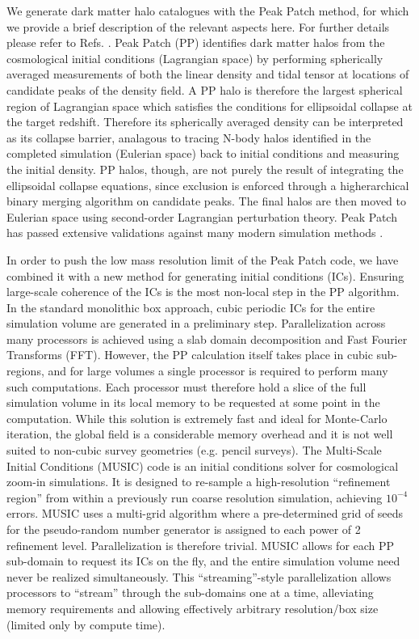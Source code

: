 We generate dark matter halo catalogues with the Peak Patch method, for which we provide a brief description of the relevant aspects here. For further details please refer to Refs. \citep{peakpatch1,peakpatch2,peakpatch3}. Peak Patch (PP) identifies dark matter halos from the cosmological initial conditions (Lagrangian space) by performing spherically averaged measurements of both the linear density and tidal tensor at locations of candidate peaks of the density field. A PP halo is therefore the largest spherical region of Lagrangian space which satisfies the conditions for ellipsoidal collapse at the target redshift. Therefore its spherically averaged density can be interpreted as its collapse barrier, analagous to tracing N-body halos identified in the completed simulation (Eulerian space) back to initial conditions and measuring the initial density. PP halos, though, are not purely the result of integrating the ellipsoidal collapse equations, since exclusion is enforced through a higherarchical binary merging algorithm on candidate peaks. The final halos are then moved to Eulerian space using second-order Lagrangian perturbation theory. Peak Patch has passed extensive validations against many modern simulation methods \cite{euclidcp1, euclidcp2, euclidcp3}.

In order to push the low mass resolution limit of the Peak Patch code, we have combined it with a new method for generating initial conditions (ICs). Ensuring large-scale coherence of the ICs is the most non-local step in the PP algorithm. In the standard monolithic box approach, cubic periodic ICs for the entire simulation volume are generated in a preliminary step. Parallelization across many processors is achieved using a slab domain decomposition and Fast Fourier Transforms (FFT). However, the PP calculation itself takes place in cubic sub-regions, and for large volumes a single processor is required to perform many such computations. Each processor must therefore hold a slice of the full simulation volume in its local memory to be requested at some point in the computation. While this solution is extremely fast and ideal for Monte-Carlo iteration, the global field is a considerable memory overhead and it is not well suited to non-cubic survey geometries (e.g. pencil surveys). The Multi-Scale Initial Conditions (MUSIC) \citep{music} code is an initial conditions solver for cosmological zoom-in simulations. It is designed to re-sample a high-resolution ``refinement region'' from within a previously run coarse resolution simulation, achieving $10^{-4}$ errors. MUSIC uses a multi-grid algorithm where a pre-determined grid of seeds for the pseudo-random number generator is assigned to each power of 2 refinement level. Parallelization is therefore trivial. MUSIC allows for each PP sub-domain to request its ICs on the fly, and the entire simulation volume need never be realized simultaneously. This ``streaming''-style parallelization allows processors to ``stream'' through the sub-domains one at a time, alleviating memory requirements and allowing effectively arbitrary resolution/box size (limited only by compute time).


